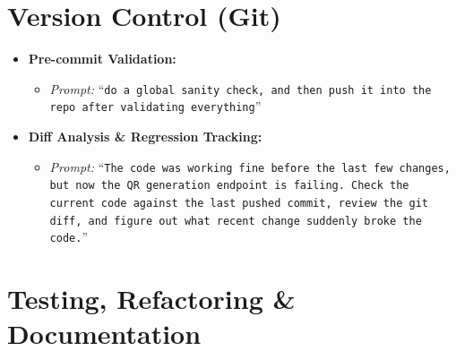 \documentclass[11pt,a4paper]{article}
\begin{document}
\section{Version Control (Git)}

\begin{itemize}[leftmargin=*, itemsep=6pt]
    \item \textbf{Pre-commit Validation:}
    \begin{itemize}[itemsep=4pt]
        \item \textit{Prompt:} ``\texttt{do a global sanity check, and then push it into the repo after validating everything}''
    \end{itemize}

    \item \textbf{Diff Analysis \& Regression Tracking:}
    \begin{itemize}[itemsep=4pt]
        \item \textit{Prompt:} ``\texttt{The code was working fine before the last few changes, but now the QR generation endpoint is failing. Check the current code against the last pushed commit, review the git diff, and figure out what recent change suddenly broke the code.}''
    \end{itemize}
\end{itemize}

\section{Testing, Refactoring \& Documentation}
\end{document}

